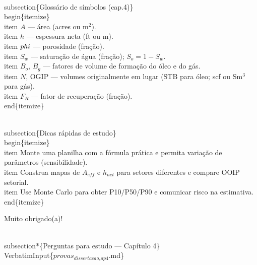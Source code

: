 \documentclass[11pt,a4paper]{article}
\begin{document}
\begin{enumerate}
{\\subsection\{Glossário de símbolos (cap.4)\}
\\begin\{itemize\}
\\item $A$ — área (acres ou m$^2$).
\\item $h$ — espessura neta (ft ou m).
\\item $\\phi$ — porosidade (fração).
\\item $S_w$ — saturação de água (fração); $S_o = 1-S_w$.
\\item $B_o$, $B_g$ — fatores de volume de formação do óleo e do gás.
\\item $N$, OGIP — volumes originalmente em lugar (STB para óleo; scf ou Sm$^3$ para gás).
\\item $F_R$ — fator de recuperação (fração).
\\end\{itemize\}

\\subsection\{Dicas rápidas de estudo\}
\\begin\{itemize\}
\\item Monte uma planilha com a fórmula prática e permita variação de parâmetros (sensibilidade).
\\item Construa mapas de $A_{eff}$ e $h_{net}$ para setores diferentes e compare OOIP setorial.
\\item Use Monte Carlo para obter P10/P50/P90 e comunicar risco na estimativa.
\\end\{itemize\}


Muito obrigado(a)!

\\subsection*\{Perguntas para estudo --- Capítulo 4\}
\\VerbatimInput\{$provas_{dissertacao_cap4}$.md\}

}
\end{enumerate}
\end{document}
